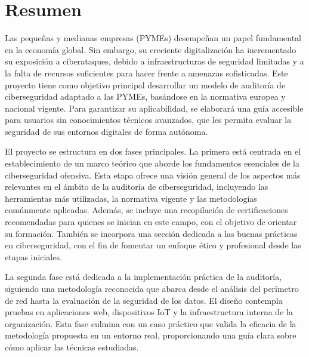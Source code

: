 \documentclass[a4paper, 10pt]{article}
\begin{document}

\section*{Resumen}
\thispagestyle{empty}
Las pequeñas y medianas empresas (PYMEs) desempeñan un papel fundamental en la economía global. Sin embargo, su creciente digitalización ha incrementado su exposición a ciberataques, debido a infraestructuras de seguridad limitadas y a la falta de recursos suficientes para hacer frente a amenazas sofisticadas.
Este proyecto tiene como objetivo principal desarrollar un modelo de auditoría de ciberseguridad adaptado a las PYMEs, basándose en la normativa europea y nacional vigente. Para garantizar su aplicabilidad, se elaborará una guía accesible para usuarios sin conocimientos técnicos avanzados, que les permita evaluar la seguridad de sus entornos digitales de forma autónoma.

\par\vspace{0.5cm}

El proyecto se estructura en dos fases principales. La primera está centrada en el establecimiento de un marco teórico que aborde los fundamentos esenciales de la ciberseguridad ofensiva. Esta etapa ofrece una visión general de los aspectos más relevantes en el ámbito de la auditoría de ciberseguridad, incluyendo las herramientas más utilizadas, la normativa vigente y las metodologías comúnmente aplicadas. Además, se incluye una recopilación de certificaciones recomendadas para quienes se inician en este campo, con el objetivo de orientar su formación. También se incorpora una sección dedicada a las buenas prácticas en ciberseguridad, con el fin de fomentar un enfoque ético y profesional desde las etapas iniciales.

\par\vspace{0.5cm}

La segunda fase está dedicada a la implementación práctica de la auditoría, siguiendo una metodología reconocida que abarca desde el análisis del perímetro de red hasta la evaluación de la seguridad de los datos. El diseño contempla pruebas en aplicaciones web, dispositivos IoT y la infraestructura interna de la organización. Esta fase culmina con un caso práctico que valida la eficacia de la metodología propuesta en un entorno real, proporcionando una guía clara sobre cómo aplicar las técnicas estudiadas.
\end{document}
